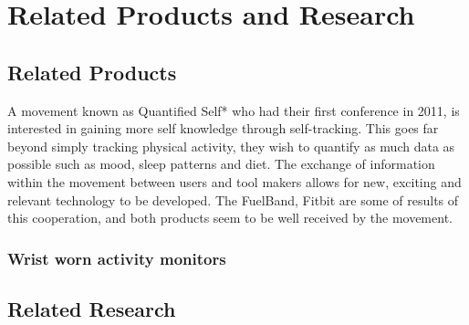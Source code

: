 \chapter{Related Products and Research} %

\label{Chapter3} %


\section{Related Products}

A movement known as Quantified Self*\cite{quantifiedSelf} who had their first conference in 2011\cite{bodyHackers}, is interested in gaining more self knowledge through self-tracking. This goes far beyond simply tracking physical activity, they wish to quantify as much data as possible such as mood, sleep patterns and diet. The exchange of information within the movement between users and tool makers allows for new, exciting and relevant technology to be developed. The FuelBand\cite{fuelBand}, Fitbit\cite{fitBit} are some of results of this cooperation, and both products seem to be well received by the movement. %

\subsection{Wrist worn activity monitors}


\section{Related Research}

